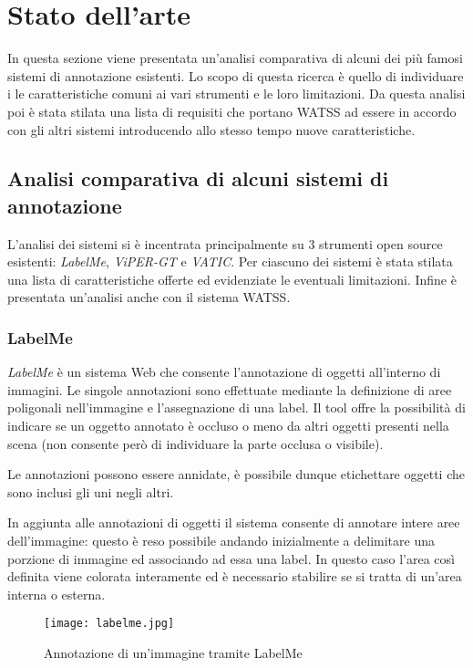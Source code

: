 \chapter{Stato dell'arte}
\label{ch:panoramica}

In questa sezione viene presentata un'analisi comparativa di alcuni dei più famosi sistemi di annotazione esistenti. Lo scopo di questa ricerca è quello di individuare i le caratteristiche comuni ai vari strumenti e le loro limitazioni. Da questa analisi poi è stata stilata una lista di requisiti che portano WATSS ad essere in accordo con gli altri sistemi introducendo allo stesso tempo nuove caratteristiche.

\section{Analisi comparativa di alcuni sistemi di annotazione}

L'analisi dei sistemi si è incentrata principalmente su 3 strumenti open source esistenti: \emph{LabelMe}, \emph{ViPER-GT} e \emph{VATIC}. Per ciascuno dei sistemi è stata stilata una lista di caratteristiche offerte ed evidenziate le eventuali limitazioni. Infine è presentata un'analisi anche con il sistema WATSS.

\subsection{LabelMe}

\emph{LabelMe} è un sistema Web che consente l'annotazione di oggetti all'interno di immagini. Le singole annotazioni sono effettuate mediante la definizione di aree poligonali nell'immagine e l'assegnazione di una label. Il tool offre la possibilità di indicare se un oggetto annotato è occluso o meno da altri oggetti presenti nella scena (non consente però di individuare la parte occlusa o visibile).

Le annotazioni possono essere annidate, è possibile dunque etichettare oggetti che sono inclusi gli uni negli altri. 

In aggiunta alle annotazioni di oggetti il sistema consente di annotare intere aree dell'immagine: questo è reso possibile andando inizialmente a delimitare una porzione di immagine ed associando ad essa una label. In questo caso l'area così definita viene colorata interamente ed è necessario stabilire se si tratta di un'area interna o esterna.

\begin{figure}[H]
\centering
\texttt{[image: labelme.jpg]}
  \label{fig:labelme}
  \caption{Annotazione di un'immagine tramite LabelMe}
\end{figure}


